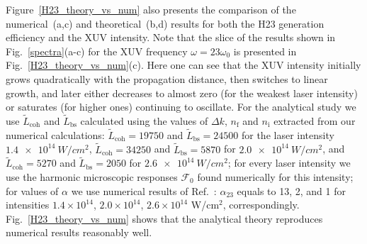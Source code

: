 Figure~\ref{H23_theory_vs_num} also presents the comparison of the numerical~(a,c) and theoretical~(b,d) results for both the H23 generation efficiency and the XUV intensity. Note that the slice of the results shown in Fig.~\ref{spectra}(a-c) for the XUV frequency $\omega=23 \omega_0$ is presented in Fig.~\ref{H23_theory_vs_num}(c). Here one can see that the XUV intensity initially grows quadratically with the propagation distance, then switches to linear growth, and later either decreases to almost zero (for the weakest laser intensity) or saturates (for higher ones) continuing to oscillate. For the analytical study we use $\tilde L_\mathrm{coh}$ and $\tilde L_\mathrm{bs}$ calculated using the values of $\Delta k$, $n_\mathrm{f}$ and $n_\mathrm{i}$ extracted from our numerical calculations: $\tilde L_\mathrm{coh}=19750$ and $\tilde L_\mathrm{bs}=24500$ for the laser intensity $\SI{1.4e14}{W/cm^2}$, $\tilde L_\mathrm{coh}=34250$ and $\tilde L_\mathrm{bs}=5870$ for $\SI{2.0e14}{W/cm^2}$, and $\tilde L_\mathrm{coh}=5270$ and $\tilde L_\mathrm{bs}=2050$ for $\SI{2.6e14}{W/cm^2}$; for every laser intensity we use the harmonic microscopic responses $\mathcal{F}_0$ found numerically for this intensity; for values of $\alpha$ we use numerical results of Ref.~\cite{Khokhlova}: $\alpha_{23}$ equals to 13, 2, and 1 for intensities $1.4 \times 10^{14}$, $2.0 \times 10^{14}$, $2.6 \times 10^{14}$ W/cm$^2$, correspondingly. Fig.~\ref{H23_theory_vs_num} shows that the analytical theory reproduces numerical results reasonably well. 

